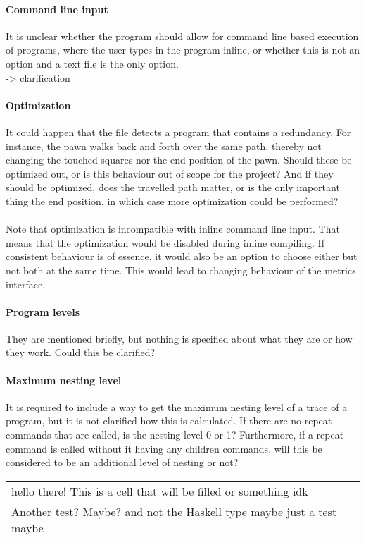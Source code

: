 \paragraph{Command line input}
It is unclear whether the program should allow for command line based execution of programs, where the user types in the program inline, or whether this is not an option and a text file is the only option. \\
-> clarification

\paragraph{Optimization}
It could happen that the file detects a program that contains a redundancy. For instance, the pawn walks back and forth over the same path, thereby not changing the touched squares nor the end position of the pawn. Should these be optimized out, or is this behaviour out of scope for the project? And if they should be optimized, does the travelled path matter, or is the only important thing the end position, in which case more optimization could be performed?\\~\\
Note that optimization is incompatible with inline command line input. That means that the optimization would be disabled during inline compiling. If consistent behaviour is of essence, it would also be an option to choose either but not both at the same time. This would lead to changing behaviour of the metrics interface. 

\paragraph{Program levels}
They are mentioned briefly, but nothing is specified about what they are or how they work. Could this be clarified?

\paragraph{Maximum nesting level}
It is required to include a way to get the maximum nesting level of a trace of a program, but it is not clarified how this is calculated. If there are no repeat commands that are called, is the nesting level 0 or 1? Furthermore, if a repeat command is called without it having any children commands, will this be considered to be an additional level of nesting or not?

\begin{table}[h]
    \centering
    \begin{tabular}{>{\columncolor{lightgreen}}l}
        hello there! This is a cell that will be filled or something idk\\ Another test? Maybe? and not the Haskell type maybe just a test maybe
    \end{tabular}
\end{table}
